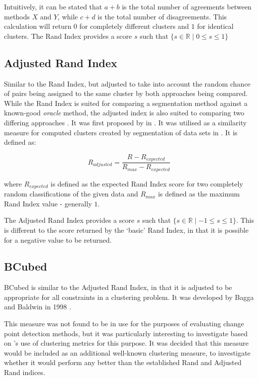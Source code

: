\documentclass[../main.tex]{subfiles}
\begin{document}
	Intuitively, it can be stated that $a+b$ is the total number of agreements between methods $X$ and $Y$, while $c+d$ is the total number of disagreements. This calculation will return $0$ for completely different clusters and $1$ for identical clusters. The Rand Index provides a score $s$ such that $ \{s\in\mathbb{R} \mid 0\leq s \leq 1\} $
	
\subsection{Adjusted Rand Index}
	
Similar to the Rand Index, but adjusted to take into account the random chance of pairs being assigned to the same cluster by both approaches being compared. While the Rand Index is suited for comparing a segmentation method against a known-good \emph{oracle} method, the adjusted index is also suited to comparing two differing approaches \cite{Matteson2012}. It was first proposed by \citeauthor{Hubert1985} in  \cite{Hubert1985}. It was utilised as a similarity measure for computed clusters created by segmentation of data sets in \cite{Matteson2012}. It is defined as:
	
	\begin{equation}
	    R_{adjusted} = \frac{R - R_{expected}}{R_{max} - R_{expected}}
	\end{equation}
	
	where $R_{expected}$ is defined as the expected Rand Index score for two completely random classifications of the given data \cite{Matteson2012} and $R_{max}$ is defined as the maximum Rand Index value - generally $1$.
	
	The Adjusted Rand Index provides a score $s$ such that $ \{s\in\mathbb{R} \mid -1\leq s \leq 1\} $. This is different to the score returned by the `basic' Rand Index, in that it is possible for a negative value to be returned.
		
\subsection{BCubed}
		
BCubed is similar to the Adjusted Rand Index, in that it is adjusted to be appropriate for all constraints in a clustering problem. It was developed by Bagga and Baldwin in 1998 \cite{Bagga1998}.

This measure was not found to be in use for the purposes of evaluating change point detection methods, but it was particularly interesting to investigate based on \citeauthor{Matteson2012}'s use of clustering metrics \cite{Matteson2012} for this purpose. It was decided that this measure would be included as an additional well-known clustering measure, to investigate whether it would perform any better than the established Rand and Adjusted Rand indices.
	
\end{document}
